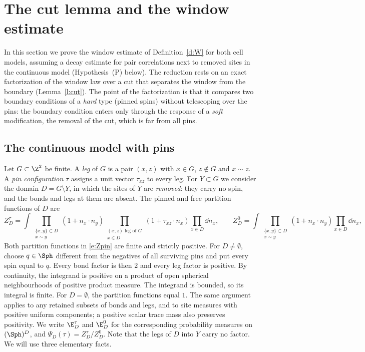 \section{The cut lemma and the window estimate}\label{s:cut}

In this section we prove the window estimate of Definition~\ref{d:W} for both cell models, assuming a decay estimate for pair correlations next to removed sites in the continuous model (Hypothesis~(P) below). The reduction rests on an exact factorization of the window law over a cut that separates the window from the boundary (Lemma~\ref{l:cut}). The point of the factorization is that it compares two boundary conditions of a \emph{hard} type (pinned spins) without telescoping over the pins: the boundary condition enters only through the response of a \emph{soft} modification, the removal of the cut, which is far from all pins.

\subsection{The continuous model with pins}\label{s:contmodel}

Let $G \subset \Z^2$ be finite. A \emph{leg} of $G$ is a pair $(x, z)$ with $x \in G$, $z \notin G$ and $x \sim z$. A \emph{pin configuration} $\tau$ assigns a unit vector $\tau_{xz}$ to every leg. For $Y \subset G$ we consider the domain $D = G \setminus Y$, in which the sites of $Y$ are \emph{removed}: they carry no spin, and the bonds and legs at them are absent. The pinned and free partition functions of $D$ are
\begin{equation}\label{e:Zpin}
Z^\tau_D = \int \prod_{\substack{\{x, y\} \subset D \\ x \sim y}} (1 + n_x \cdot n_y) \prod_{\substack{(x, z) \text{ leg of } G \\ x \in D}} (1 + \tau_{xz} \cdot n_x) \prod_{x \in D} \dd n_x, \qquad Z^0_D = \int \prod_{\substack{\{x, y\} \subset D \\ x \sim y}} (1 + n_x \cdot n_y) \prod_{x \in D} \dd n_x ,
\end{equation}
Both partition functions in \eqref{e:Zpin} are finite and strictly positive. For $D\ne\emptyset$, choose $q\in\Sph$ different from the negatives of all surviving pins and put every spin equal to $q$. Every bond factor is then $2$ and every leg factor is positive. By continuity, the integrand is positive on a product of open spherical neighbourhoods of positive product measure. The integrand is bounded, so its integral is finite. For $D=\emptyset$, the partition functions equal $1$. The same argument applies to any retained subsets of bonds and legs, and to site measures with positive uniform components; a positive scalar trace mass also preserves positivity. We write $\E^\tau_D$ and $\E^0_D$ for the corresponding probability measures on $(\Sph)^D$, and $\Psi_D(\tau) = Z^\tau_D / Z^0_D$. Note that the legs of $D$ into $Y$ carry no factor. We will use three elementary facts.

